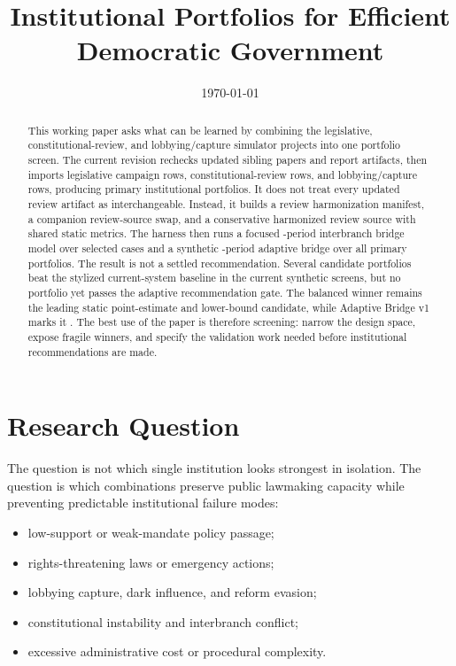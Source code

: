 \documentclass[11pt]{article}
\title{Institutional Portfolios for Efficient Democratic Government}
\author{}
\date{\today}
\begin{document}
\maketitle

\begin{abstract}
This working paper asks what can be learned by combining the legislative, constitutional-review, and lobbying/capture simulator projects into one portfolio screen. The current revision rechecks \SourcePaperCrosswalkCount{} updated sibling papers and report artifacts, then imports \LegislativeRowCount{} legislative campaign rows, \ReviewRowCount{} constitutional-review rows, and \AntiCaptureRowCount{} lobbying/capture rows, producing \PortfolioCount{} primary institutional portfolios. It does not treat every updated review artifact as interchangeable. Instead, it builds a review harmonization manifest, a companion review-source swap, and a conservative harmonized review source with \ReviewHarmonizedMetricCount{} shared static metrics. The harness then runs a focused \BridgePeriodCount-period interbranch bridge model over \BridgeCaseCount{} selected cases and a synthetic \AdaptiveBridgePeriodCount-period adaptive bridge over all \AdaptiveBridgePortfolioCount{} primary portfolios. The result is not a settled recommendation. Several candidate portfolios beat the stylized current-system baseline in the current synthetic screens, but no portfolio yet passes the adaptive recommendation gate. The balanced winner remains the leading static point-estimate and lower-bound candidate, while Adaptive Bridge v1 marks it \BalancedAdaptiveGate. The best use of the paper is therefore screening: narrow the design space, expose fragile winners, and specify the validation work needed before institutional recommendations are made.
\end{abstract}

\section{Research Question}

The question is not which single institution looks strongest in isolation. The question is which combinations preserve public lawmaking capacity while preventing predictable institutional failure modes:

\begin{itemize}
  \item low-support or weak-mandate policy passage;
  \item rights-threatening laws or emergency actions;
  \item lobbying capture, dark influence, and reform evasion;
  \item constitutional instability and interbranch conflict;
  \item excessive administrative cost or procedural complexity.
\end{itemize}
\end{document}
